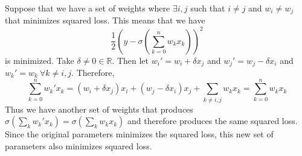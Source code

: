 
Suppose that we have a set of weights where $\exists i,j$ such that $i\neq j$ and $w_i \neq w_j$ that minimizes squared loss. This means that we have
$$
\frac{1}{2}\left(y - \sigma\left(\sum_{k=0}^n w_k x_k\right)\right)^2
$$
is minimized. Take $\delta \neq 0 \in \mathbb{R}$. Then let $w_i' = w_i + \delta x_j$ and $w_j' = w_j - \delta x_i$ and $w_k' = w_k ~\forall k \neq i,j$. Therefore, 
$$
\sum_{k=0}^n w_k'x_k = (w_i + \delta x_j)x_i + (w_j - \delta x_i) x_j + \sum_{k\neq i,j} w_k x_k = \sum_{k=0}^n w_k x_k
$$
Thus we have another set of weights that produces $\sigma(\sum_k w_k' x_k) = \sigma(\sum_k w_k x_k)$ and therefore produces the same squared loss. Since the original parameters minimizes the squared loss, this new set of parameters also minimizes squared loss. 

